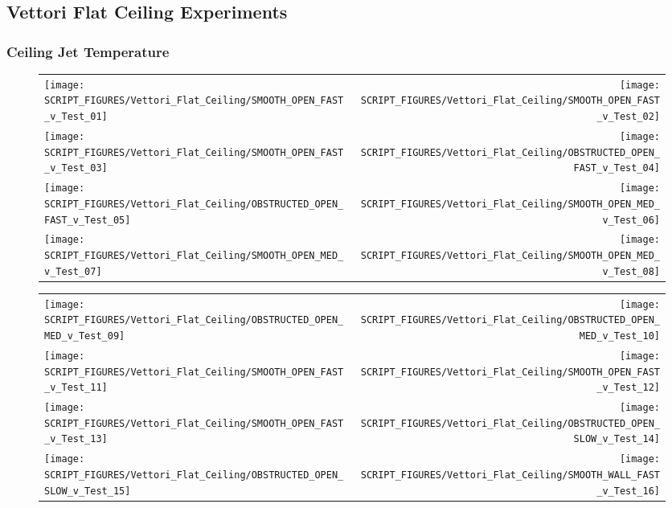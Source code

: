 \clearpage

\subsection{Vettori Flat Ceiling Experiments}

\subsubsection{Ceiling Jet Temperature}

\begin{figure}[!ht]
\begin{tabular*}{\textwidth}{l@{\extracolsep{\fill}}r}
\texttt{[image: SCRIPT\_FIGURES/Vettori\_Flat\_Ceiling/SMOOTH\_OPEN\_FAST\_v\_Test\_01]} &
\texttt{[image: SCRIPT\_FIGURES/Vettori\_Flat\_Ceiling/SMOOTH\_OPEN\_FAST\_v\_Test\_02]} \\
\texttt{[image: SCRIPT\_FIGURES/Vettori\_Flat\_Ceiling/SMOOTH\_OPEN\_FAST\_v\_Test\_03]} &
\texttt{[image: SCRIPT\_FIGURES/Vettori\_Flat\_Ceiling/OBSTRUCTED\_OPEN\_FAST\_v\_Test\_04]} \\
\texttt{[image: SCRIPT\_FIGURES/Vettori\_Flat\_Ceiling/OBSTRUCTED\_OPEN\_FAST\_v\_Test\_05]} &
\texttt{[image: SCRIPT\_FIGURES/Vettori\_Flat\_Ceiling/SMOOTH\_OPEN\_MED\_v\_Test\_06]} \\
\texttt{[image: SCRIPT\_FIGURES/Vettori\_Flat\_Ceiling/SMOOTH\_OPEN\_MED\_v\_Test\_07]} &
\texttt{[image: SCRIPT\_FIGURES/Vettori\_Flat\_Ceiling/SMOOTH\_OPEN\_MED\_v\_Test\_08]} \\
\end{tabular*}
\label{Vettori_1}
\end{figure}

\begin{figure}[!ht]
\begin{tabular*}{\textwidth}{l@{\extracolsep{\fill}}r}
\texttt{[image: SCRIPT\_FIGURES/Vettori\_Flat\_Ceiling/OBSTRUCTED\_OPEN\_MED\_v\_Test\_09]} &
\texttt{[image: SCRIPT\_FIGURES/Vettori\_Flat\_Ceiling/OBSTRUCTED\_OPEN\_MED\_v\_Test\_10]} \\
\texttt{[image: SCRIPT\_FIGURES/Vettori\_Flat\_Ceiling/SMOOTH\_OPEN\_FAST\_v\_Test\_11]} &
\texttt{[image: SCRIPT\_FIGURES/Vettori\_Flat\_Ceiling/SMOOTH\_OPEN\_FAST\_v\_Test\_12]} \\
\texttt{[image: SCRIPT\_FIGURES/Vettori\_Flat\_Ceiling/SMOOTH\_OPEN\_FAST\_v\_Test\_13]} &
\texttt{[image: SCRIPT\_FIGURES/Vettori\_Flat\_Ceiling/OBSTRUCTED\_OPEN\_SLOW\_v\_Test\_14]} \\
\texttt{[image: SCRIPT\_FIGURES/Vettori\_Flat\_Ceiling/OBSTRUCTED\_OPEN\_SLOW\_v\_Test\_15]} &
\texttt{[image: SCRIPT\_FIGURES/Vettori\_Flat\_Ceiling/SMOOTH\_WALL\_FAST\_v\_Test\_16]} \\
\end{tabular*}
\label{Vettori_2}
\end{figure}

